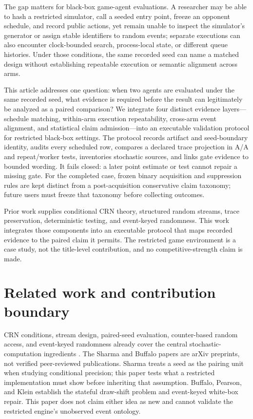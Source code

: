 \documentclass[aps,reprint,superscriptaddress,longbibliography,floatfix]{revtex4-2}
\begin{document}
The gap matters for black-box game-agent evaluations.  A researcher may be
able to hash a restricted simulator, call a seeded entry point, freeze an
opponent schedule, and record public actions, yet remain unable to inspect
the simulator's generator or assign stable identifiers to random events;
separate executions can also encounter clock-bounded search, process-local
state, or different queue histories.  Under those conditions, the same
recorded seed can name a matched design without establishing repeatable
execution or semantic alignment across arms.

This article addresses one question: when two agents are evaluated under the
same recorded seed, what evidence is required before the result can
legitimately be analyzed as a paired comparison?  We integrate four distinct
evidence layers---schedule matching, within-arm execution repeatability,
cross-arm event alignment, and statistical claim admission---into an
executable validation protocol for restricted black-box settings.  The
protocol records artifact and seed-boundary identity, audits every scheduled
row, compares a declared trace projection in A/A and repeat/worker tests,
inventories stochastic sources, and links gate evidence to bounded wording.
It fails closed: a later point estimate or test cannot repair a missing gate.
For the completed case, frozen binary acquisition and suppression rules are
kept distinct from a post-acquisition conservative claim taxonomy; future
users must freeze that taxonomy before collecting outcomes.

Prior work supplies conditional CRN theory, structured random streams, trace
preservation, deterministic testing, and event-keyed randomness.  This work
integrates those components into an executable protocol that maps recorded
evidence to the paired claim it permits.  The restricted game environment is
a case study, not the title-level contribution, and no competitive-strength
claim is made.

\section{Related work and contribution boundary}

CRN conditions, stream design, paired-seed evaluation, counter-based random
access, and event-keyed randomness already cover the central
stochastic-computation ingredients
\cite{glasserman1992crn,lecuyer2002streams,sharma2025pairedseeds,salmon2011parallel,buffalo2026eventkeyed}.
The Sharma and Buffalo papers are arXiv preprints, not verified peer-reviewed
publications.  Sharma treats a seed as the pairing unit when studying
conditional precision; this paper tests what a restricted implementation must
show before inheriting that assumption.  Buffalo, Pearson, and Klein establish
the stateful draw-shift problem and event-keyed white-box repair.  This paper
does not claim either idea as new and cannot validate the restricted engine's
unobserved event ontology.
\end{document}
